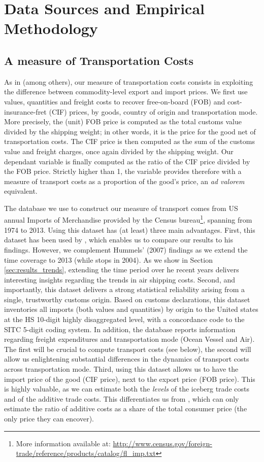 \documentclass[a4paper,11pt]{article}
\begin{document}
\section{Data Sources and Empirical Methodology \label{sec:data_method}}

\subsection{A measure of Transportation Costs}

As in \cite{hummels2007} (among others), our measure of transportation costs consists in exploiting the difference between commodity-level export and import prices.
We first use values, quantities and freight costs to recover free-on-board (FOB) and cost-insurance-fret (CIF) prices, by goods, country of origin and transportation mode. More precisely, the (unit) FOB price is computed as the total customs value divided by the shipping weight; in other words, it is the price for the good net of transportation costs. The CIF price is then computed as the sum of the customs value and freight charges, once again divided by the shipping weight. Our dependant variable is finally computed as the ratio of the CIF price divided by the FOB price. Strictly higher than 1, the variable provides therefore with a measure of transport costs as a proportion of the good's price, an \emph{ad valorem} equivalent.

The database we use to construct our measure of transport comes from US annual Imports of Merchandise provided by the Census bureau\footnote{More information available at: \url{http://www.census.gov/foreign-trade/reference/products/catalog/fl_imp.txt}}, spanning from 1974 to 2013. Using this dataset has (at least) three main advantages. First, this dataset has been used by \cite{hummels2007}, which enables us to compare our results to his findings. However, we complement Hummels' (2007) findings as we extend the time coverage to 2013 (while \cite{hummels2007} stops in 2004). As we show in Section \ref{sec:results_trends}, extending the time period over he recent years delivers interesting insights regarding the trends in air shipping costs. Second, and importantly, this dataset delivers a strong statistical reliability arising from a single, trustworthy customs origin. Based on customs declarations, this dataset inventories all imports (both values and quantities) by origin to the United states at the HS 10-digit highly disaggregated level, with a concordance code to the SITC 5-digit coding system. In addition, the database reports information regarding freight expenditures and transportation mode (Ocean Vessel and Air). The first will be crucial to compute transport costs (see below), the second will allow us enlightening substantial differences in the dynamics of transport costs across transportation mode. Third, using this dataset allows us to have the import price of the good (CIF price), next to the export price (FOB price). This is highly valuable, as we can estimate both the \textit{levels} of the iceberg trade costs and of the additive trade costs. This differentiates us from \citet{Irrazabal_2015}, which can only estimate the ratio of additive costs as a share of the total consumer price (the only price they can encover).
\end{document}
